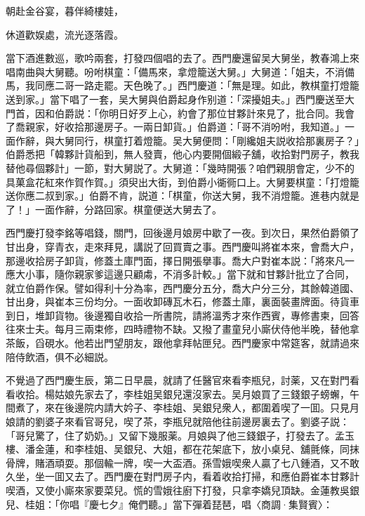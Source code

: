 \begin{myquote}
朝赴金谷宴，暮伴綺樓娃，

休道歡娱處，流光逐落霞。
\end{myquote}

當下酒進數巡，歌吟兩套，打發四個唱的去了。西門慶還留吴大舅坐，教春鴻上來唱南曲與大舅聽。吩咐棋童：「備馬來，拿燈籠送大舅。」大舅道：「姐夫，不消備馬，我同應二哥一路走罷。天色晚了。」西門慶道：「無是理。如此，教棋童打燈籠送到家。」當下唱了一套，吴大舅與伯爵起身作别道：「深擾姐夫。」西門慶送至大門首，因和伯爵説：「你明日好歹上心，約會了那位甘夥計來見了，批合同。我會了喬親家，好收拾那邊房子。一兩日卸貨。」伯爵道：「哥不消吩咐，我知道。」一面作辭，與大舅同行，棋童打着燈籠。吴大舅便問：「剛纔姐夫説收拾那裏房子？」伯爵悉把「韓夥計貨船到，無人發賣，他心内要開個緞子舖，收拾對門房子，教我替他尋個夥計」一節，對大舅説了。大舅道：「幾時開張？咱們親朋會定，少不的具菓盒花紅來作賀作賀。」須臾出大街，到伯爵小衚衕口上。大舅要棋童：「打燈籠送你應二叔到家。」伯爵不肯，説道：「棋童，你送大舅，我不消燈籠。進巷内就是了！」一面作辭，分路回家。棋童便送大舅去了。

西門慶打發李銘等唱錢，關門，回後邊月娘房中歇了一夜。到次日，果然伯爵領了甘出身，穿青衣，走來拜見，講説了回買賣之事。西門慶叫將崔本來，會喬大户，那邊收拾房子卸貨，修蓋土庫門面，擇日開張擧事。喬大户對崔本説：「將來凡一應大小事，隨你親家爹這邊只顧䖏，不消多計較。」當下就和甘夥計批立了合同，就立伯爵作保。譬如得利十分為率，西門慶分五分，喬大户分三分，其餘韓道國、甘出身，與崔本三份均分。一面收卸磚瓦木石，修蓋土庫，裏面裝畫牌面。待貨車到日，堆卸貨物。後邊獨自收拾一所書院，請將溫秀才來作西賓，專修書柬，回答往來士夫。每月三兩束修，四時禮物不缺。又撥了畫童兒小廝伏侍他半晚，替他拿茶飯，舀硯水。他若出門望朋友，跟他拿拜帖匣兒。西門慶家中常筵客，就請過來陪侍飲酒，俱不必細説。

不覺過了西門慶生辰，第二日早晨，就請了任醫官來看李瓶兒，討薬，又在對門看看收拾。楊姑娘先家去了，李桂姐吴銀兒還沒家去。吴月娘買了三錢銀子螃蠏，午間煮了，來在後邊院内請大妗子、李桂姐、吴銀兒衆人，都圍着喫了一囬。只見月娘請的劉婆子來看官哥兒，喫了茶，李瓶兒就陪他往前邊房裏去了。劉婆子説：「哥兒驚了，住了奶奶。」又留下幾服薬。月娘與了他三錢銀子，打發去了。孟玉樓、潘金蓮，和李桂姐、吴銀兒、大姐，都在花架底下，放小桌兒、舖氈條，同抹骨牌，賭酒頑耍。那個輸一牌，喫一大盃酒。孫雪娥喫衆人贏了七八鍾酒，又不敢久坐，坐一囬又去了。西門慶在對門房子内，看着收拾打掃，和應伯爵崔本甘夥計喫酒，又使小廝來家要菜兒。慌的雪娥往廚下打發，只拿李嬌兒頂缺。金蓮教吳銀兒、桂姐：「你唱『慶七夕』俺們聽。」當下彈着琵琶，唱〈商調·集賢賓〉：

